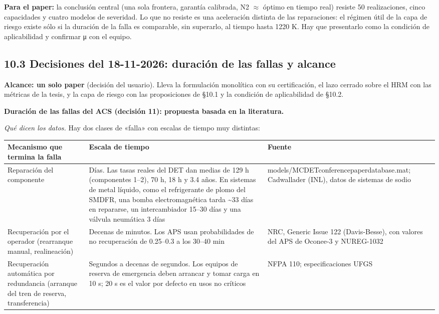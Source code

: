 \documentclass[11pt,a4paper]{article}
\newcommand{\codeus}{\textunderscore\allowbreak}
\newcommand{\code}[1]{{\small\ttfamily\let\_\codeus #1}}
\begin{document}
\textbf{Para el paper:} la conclusión central (una sola frontera, garantía calibrada, N2 $\approx$ óptimo en tiempo real) resiste 50 realizaciones, cinco capacidades y cuatro modelos de severidad. Lo que no resiste es una aceleración distinta de las reparaciones: el régimen útil de la capa de riesgo existe sólo si la duración de la falla es comparable, sin superarlo, al tiempo hasta 1220 K. Hay que presentarlo como la condición de aplicabilidad y confirmar μ con el equipo.

\subsection*{10.3 Decisiones del 18-11-2026: duración de las fallas y alcance}
\textbf{Alcance: un solo paper} (decisión del usuario). Lleva la formulación monolítica con su certificación, el lazo cerrado sobre el HRM con las métricas de la tesis, y la capa de riesgo con las proposiciones de \S{}10.1 y la condición de aplicabilidad de \S{}10.2.

\textbf{Duración de las fallas del ACS (decisión 11): propuesta basada en la literatura.}

\emph{Qué dicen los datos.} Hay dos clases de «falla» con escalas de tiempo muy distintas:

{\small
\begin{xltabular}{\linewidth}{@{}YYY@{}}
\toprule
\textbf{Mecanismo que termina la falla} & \textbf{Escala de tiempo} & \textbf{Fuente} \\
\midrule
\endhead
Reparación del componente & Días. Las tasas reales del DET dan medias de 129 h (componentes 1–2), 70 h, 18 h y 3.4 años. En sistemas de metal líquido, como el refrigerante de plomo del SMDFR, una bomba electromagnética tarda \textasciitilde{}33 días en repararse, un intercambiador 15–30 días y una válvula neumática 3 días & \code{models/MCDET\_conferencepaper\_database.mat}; Cadwallader (INL), datos de sistemas de sodio \\
Recuperación por el operador (rearranque manual, realineación) & Decenas de minutos. Los APS usan probabilidades de no recuperación de 0.25–0.3 a los 30–40 min & NRC, Generic Issue 122 (Davis-Besse), con valores del APS de Oconee-3 y NUREG-1032 \\
Recuperación automática por redundancia (arranque del tren de reserva, transferencia) & Segundos a decenas de segundos. Los equipos de reserva de emergencia deben arrancar y tomar carga en 10 s; 20 s es el valor por defecto en usos no críticos & NFPA 110; especificaciones UFGS \\
\bottomrule
\end{xltabular}}
\end{document}
